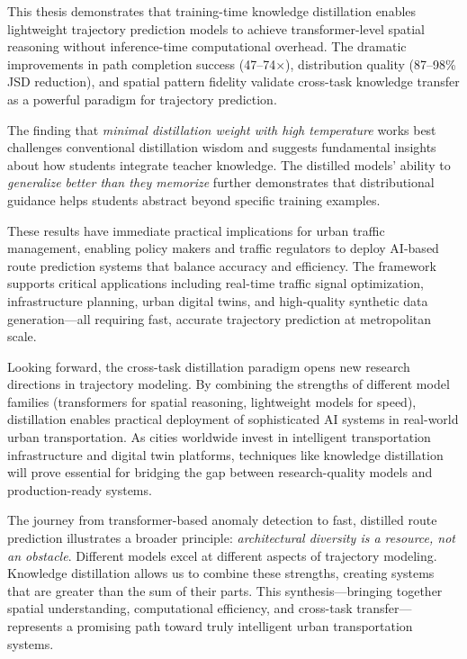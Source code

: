 This thesis demonstrates that training-time knowledge distillation enables lightweight trajectory prediction models to achieve transformer-level spatial reasoning without inference-time computational overhead. The dramatic improvements in path completion success (47--74$\times$), distribution quality (87--98\% JSD reduction), and spatial pattern fidelity validate cross-task knowledge transfer as a powerful paradigm for trajectory prediction.

The finding that \emph{minimal distillation weight with high temperature} works best challenges conventional distillation wisdom and suggests fundamental insights about how students integrate teacher knowledge. The distilled models' ability to \emph{generalize better than they memorize} further demonstrates that distributional guidance helps students abstract beyond specific training examples.

These results have immediate practical implications for urban traffic management, enabling policy makers and traffic regulators to deploy AI-based route prediction systems that balance accuracy and efficiency. The framework supports critical applications including real-time traffic signal optimization, infrastructure planning, urban digital twins, and high-quality synthetic data generation—all requiring fast, accurate trajectory prediction at metropolitan scale.

Looking forward, the cross-task distillation paradigm opens new research directions in trajectory modeling. By combining the strengths of different model families (transformers for spatial reasoning, lightweight models for speed), distillation enables practical deployment of sophisticated AI systems in real-world urban transportation. As cities worldwide invest in intelligent transportation infrastructure and digital twin platforms, techniques like knowledge distillation will prove essential for bridging the gap between research-quality models and production-ready systems.

The journey from transformer-based anomaly detection to fast, distilled route prediction illustrates a broader principle: \emph{architectural diversity is a resource, not an obstacle}. Different models excel at different aspects of trajectory modeling. Knowledge distillation allows us to combine these strengths, creating systems that are greater than the sum of their parts. This synthesis—bringing together spatial understanding, computational efficiency, and cross-task transfer—represents a promising path toward truly intelligent urban transportation systems.


